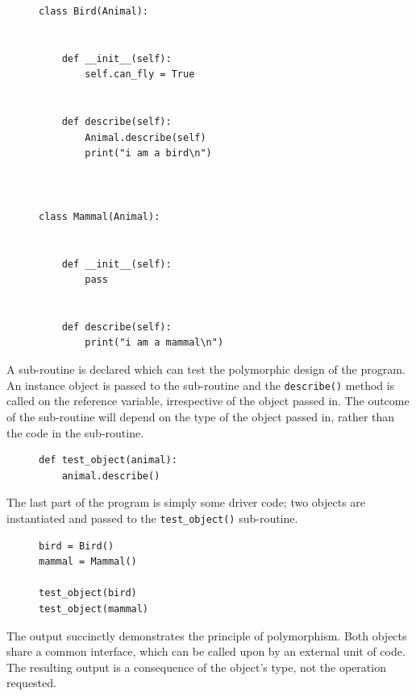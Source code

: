 \documentclass[10pt]{article}
\begin{document}
\begin{figure}[H]
\begin{verbatim}
class Bird(Animal):


    def __init__(self):
        self.can_fly = True


    def describe(self):
        Animal.describe(self)
        print("i am a bird\n")



class Mammal(Animal):


    def __init__(self):
        pass


    def describe(self):
        print("i am a mammal\n")
\end{verbatim}
\end{figure}

A sub-routine is declared which can test the polymorphic design of the program. An instance object is passed to the sub-routine and the \texttt{describe()} method is called on the reference variable, irrespective of the object passed in. The outcome of the sub-routine will depend on the type of the object passed in, rather than the code in the sub-routine.

\begin{figure}[H]
\begin{verbatim}
def test_object(animal):
    animal.describe()
\end{verbatim}
\end{figure}

The last part of the program is simply some driver code; two objects are instantiated and passed to the \texttt{test\_object()} sub-routine.

\begin{figure}[H]
\begin{verbatim}
bird = Bird()
mammal = Mammal()

test_object(bird)
test_object(mammal)
\end{verbatim}
\end{figure}

The output succinctly demonstrates the principle of polymorphism. Both objects share a common interface, which can be called upon by an external unit of code. The resulting output is a consequence of the object's type, not the operation requested.
\end{document}
